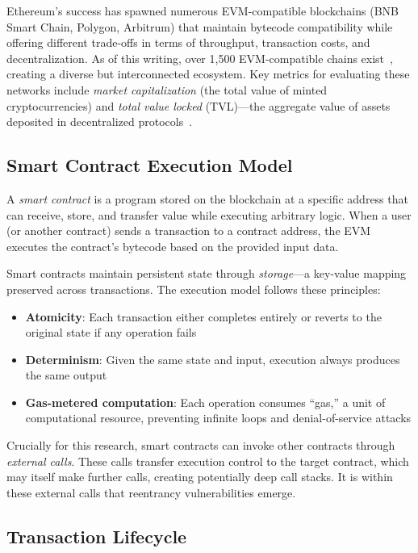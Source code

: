Ethereum's success has spawned numerous EVM-compatible blockchains (\eg BNB Smart Chain, Polygon, Arbitrum) that maintain bytecode compatibility while offering different trade-offs in terms of throughput, transaction costs, and decentralization. As of this writing, over 1,500 EVM-compatible chains exist~\cite{chainlist}, creating a diverse but interconnected ecosystem. Key metrics for evaluating these networks include \textit{market capitalization} (the total value of minted cryptocurrencies) and \textit{total value locked} (TVL)---the aggregate value of assets deposited in decentralized protocols~\cite{coingecko}.

\subsection{Smart Contract Execution Model}

A \textit{smart contract} is a program stored on the blockchain at a specific address that can receive, store, and transfer value while executing arbitrary logic. When a user (or another contract) sends a transaction to a contract address, the EVM executes the contract's bytecode based on the provided input data.

Smart contracts maintain persistent state through \textit{storage}---a key-value mapping preserved across transactions. The execution model follows these principles:

\begin{itemize}
    \item \textbf{Atomicity}: Each transaction either completes entirely or reverts to the original state if any operation fails
    \item \textbf{Determinism}: Given the same state and input, execution always produces the same output
    \item \textbf{Gas-metered computation}: Each operation consumes ``gas,'' a unit of computational resource, preventing infinite loops and denial-of-service attacks
\end{itemize}

Crucially for this research, smart contracts can invoke other contracts through \textit{external calls}. These calls transfer execution control to the target contract, which may itself make further calls, creating potentially deep call stacks. It is within these external calls that reentrancy vulnerabilities emerge.

\subsection{Transaction Lifecycle}

